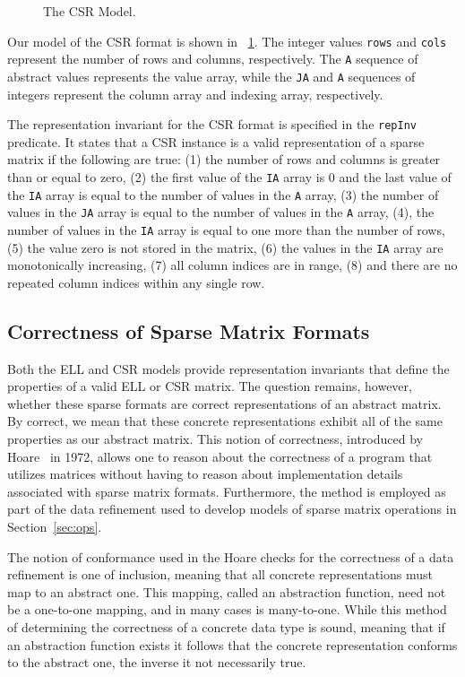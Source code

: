 \begin{figure}

\caption{The CSR Model.}
\label{model:csr}
\end{figure}

Our model of the CSR format is shown in \figurename~\ref{model:csr}.  The integer values \texttt{rows} and \texttt{cols} represent the number of rows and columns, respectively.  The \texttt{A} sequence of abstract values represents the value array, while the \texttt{JA} and \texttt{A} sequences of integers represent the column array and indexing array, respectively.

The representation invariant for the CSR format is specified in the \texttt{repInv} predicate.  It states that a CSR instance is a valid representation of a sparse matrix if the following are true: (1) the number of rows and columns is greater than or equal to zero, (2) the first value of the \texttt{IA} array is 0 and the last value of the \texttt{IA} array is equal to the number of values in the \texttt{A} array, (3) the number of values in the \texttt{JA} array is equal to the number of values in the \texttt{A} array, (4), the number of values in the \texttt{IA} array is equal to one more than the number of rows, (5) the value zero is not stored in the matrix, (6) the values in the \texttt{IA} array are monotonically increasing, (7) all column indices are in range, (8) and there are no repeated column indices within any single row.

\subsection{Correctness of Sparse Matrix Formats}

Both the ELL and CSR models provide representation invariants that define the properties of a valid ELL or CSR matrix.  The question remains, however, whether these sparse formats are correct representations of an abstract matrix.  By correct, we mean that these concrete representations exhibit all of the same properties as our abstract matrix.  This notion of correctness, introduced by Hoare~\cite{} in 1972, allows one to reason about the correctness of a program that utilizes matrices without having to reason about implementation details associated with sparse matrix formats.  Furthermore, the method is employed as part of the data refinement used to develop models of sparse matrix operations in Section~\ref{sec:ops}.

The notion of conformance used in the Hoare checks for the correctness of a data refinement is one of inclusion, meaning that all concrete representations must map to an abstract one.  This mapping, called an abstraction function, need not be a one-to-one mapping, and in many cases is many-to-one.  While this method of determining the correctness of a concrete data type is sound, meaning that if an abstraction function exists it follows that the concrete representation conforms to the abstract one, the inverse it not necessarily true. 

